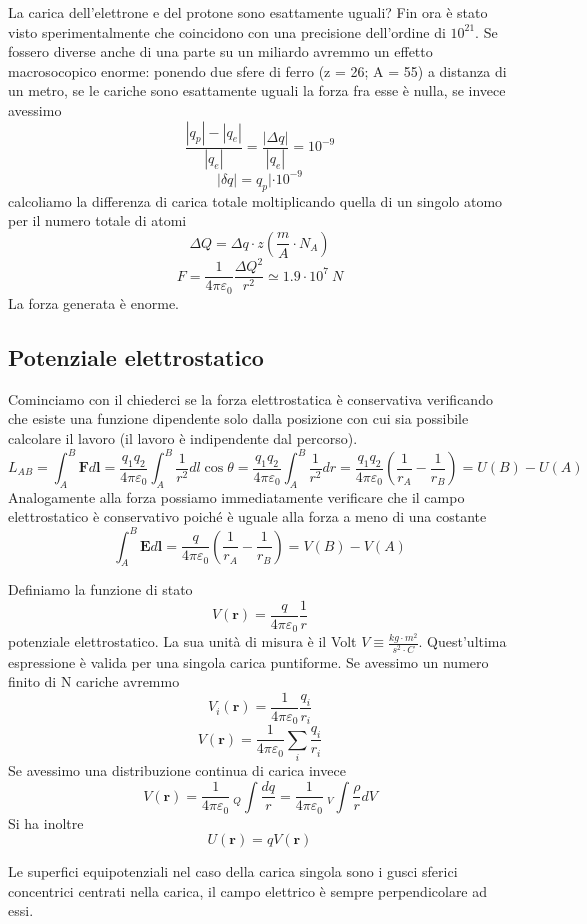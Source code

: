 \documentclass[
10pt, %
a4paper, %
oneside, %
headinclude,footinclude, %
BCOR5mm, %
]{scrartcl}
\begin{document}
La carica dell'elettrone e del protone sono esattamente uguali? Fin ora è stato visto sperimentalmente che coincidono con una precisione dell'ordine di \(10^{21}\). Se fossero diverse anche di una parte su un miliardo avremmo un effetto macrosocopico enorme: ponendo due sfere di ferro (z = 26; A = 55) a distanza di un metro, se le cariche sono esattamente uguali la forza fra esse è nulla, se invece avessimo 
\[\frac{|q_p|-|q_e|}{|q_e|} = \frac{|\Delta q|}{|q_e|}=10^{-9}\]
\[|\delta q| = q_p|\cdot10^{-9}\]
calcoliamo la differenza di carica totale moltiplicando quella di un singolo atomo per il numero totale di atomi
\[\Delta Q = \Delta q\cdot z \left(\frac{m}{A}\cdot N_A\right) \]
\[F=\frac{1}{4\pi\varepsilon_0}\frac{\Delta Q^2}{r^2}\simeq 1.9\cdot10^{7}\ N\]
La forza generata è enorme. 
\subsection{Potenziale elettrostatico}
Cominciamo con il chiederci se la forza elettrostatica è conservativa verificando che esiste una funzione dipendente solo dalla posizione con cui sia possibile calcolare il lavoro (il lavoro è indipendente dal percorso). 
\[L_{AB} = \int_{A}^{B}\mathbf{F}d\mathbf{l}= \frac{q_1q_2}{4\pi\varepsilon_0}\int_{A}^{B}\frac{1}{r^2}dl\cos\theta=\frac{q_1q_2}{4\pi\varepsilon_0}\int_{A}^{B}\frac{1}{r^2}dr=\frac{q_1q_2}{4\pi\varepsilon_0}\left(\frac{1}{r_A}-\frac{1}{r_B}\right)=U(B)-U(A)\]
Analogamente alla forza possiamo immediatamente verificare che il campo elettrostatico è conservativo poiché è uguale alla forza a meno di una costante
\[\int_{A}^{B}\mathbf{E}d\mathbf{l}=\frac{q}{4\pi\varepsilon_0}\left(\frac{1}{r_A}-\frac{1}{r_B}\right)=V(B)-V(A)\]
\begin{definizione}
Definiamo la funzione di stato 
\[V(\mathbf{r}) = \frac{q}{4\pi\varepsilon_0}\frac{1}{r}\]
potenziale elettrostatico. La sua unità di misura è il Volt $V \equiv \frac{kg\cdot m^2}{s^2\cdot C}$.  Quest'ultima espressione è valida per una singola carica puntiforme. Se avessimo un numero finito di N cariche avremmo
\[V_i(\mathbf{r}) = \frac{1}{4\pi\varepsilon_0}\frac{q_i}{r_i}\]
\[V(\mathbf{r})= \frac{1}{4\pi\varepsilon_0}\sum_{i}\frac{q_i}{r_i}\]
Se avessimo una distribuzione continua di carica invece
\[V(\mathbf{r})= \frac{1}{4\pi\varepsilon_0}\ _Q\int\frac{d q}{r} =  \frac{1}{4\pi\varepsilon_0}\ _V\int\frac{\rho}{ r}dV\]
Si ha inoltre 
\[U(\mathbf{r})=qV(\mathbf{r})\]
\end{definizione}
Le superfici equipotenziali nel caso della carica singola sono i gusci sferici concentrici centrati nella carica, il campo elettrico è sempre perpendicolare ad essi.\\
\end{document}
